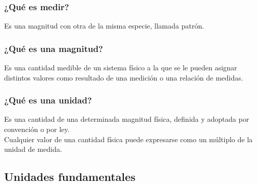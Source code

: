 \documentclass[14pt]{beamer}
\begin{document}
\begin{frame}
\frametitle{¿Qué es medir?}
Es  una magnitud con otra de la misma especie, llamada patrón.
\end{frame}
\begin{frame}
\frametitle{¿Qué es una magnitud?}
Es una cantidad medible de un sistema físico a la que se le pueden asignar distintos valores como resultado de una medición o una relación de medidas.
\end{frame}
\begin{frame}
\frametitle{¿Qué es una unidad?}
Es una cantidad de una determinada magnitud física, definida y adoptada por convención o por ley.
\\
\bigskip
\pause
Cualquier valor de una cantidad física puede expresarse como un múltiplo de la unidad de medida.
\end{frame}

\subsection{Unidades fundamentales}
\end{document}
